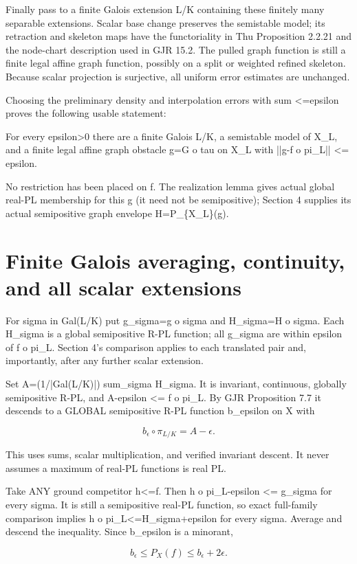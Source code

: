 \documentclass[11pt]{article}
\begin{document}
Finally pass to a finite Galois extension L/K containing these finitely many separable extensions. Scalar base change preserves the semistable model; its retraction and skeleton maps have the functoriality in Thu Proposition 2.2.21 and the node-chart description used in GJR 15.2. The pulled graph function is still a finite legal affine graph function, possibly on a split or weighted refined skeleton. Because scalar projection is surjective, all uniform error estimates are unchanged.

Choosing the preliminary density and interpolation errors with sum <=epsilon proves the following usable statement:

For every epsilon>0 there are a finite Galois L/K, a semistable model of X\_L, and a finite legal affine graph obstacle g=G o tau on X\_L with ||g-f o pi\_L|| <= epsilon.

No restriction has been placed on f. The realization lemma gives actual global real-PL membership for this g (it need not be semipositive); Section 4 supplies its actual semipositive graph envelope H=P\_\{X\_L\}(g).

\section{Finite Galois averaging, continuity, and all scalar extensions}

For sigma in Gal(L/K) put g\_sigma=g o sigma and H\_sigma=H o sigma. Each H\_sigma is a global semipositive R-PL function; all g\_sigma are within epsilon of f o pi\_L. Section 4's comparison applies to each translated pair and, importantly, after any further scalar extension.

Set A=(1/|Gal(L/K)|) sum\_sigma H\_sigma. It is invariant, continuous, globally semipositive R-PL, and A-epsilon <= f o pi\_L. By GJR Proposition 7.7 it descends to a GLOBAL semipositive R-PL function b\_epsilon on X with

\[
b_\epsilon\circ\pi_{L/K}=A-\epsilon.
\]

This uses sums, scalar multiplication, and verified invariant descent. It never assumes a maximum of real-PL functions is real PL.

Take ANY ground competitor h<=f. Then h o pi\_L-epsilon <= g\_sigma for every sigma. It is still a semipositive real-PL function, so exact full-family comparison implies h o pi\_L<=H\_sigma+epsilon for every sigma. Average and descend the inequality. Since b\_epsilon is a minorant,

\[
b_\epsilon\le P_X(f)\le b_\epsilon+2\epsilon.
\]
\end{document}
